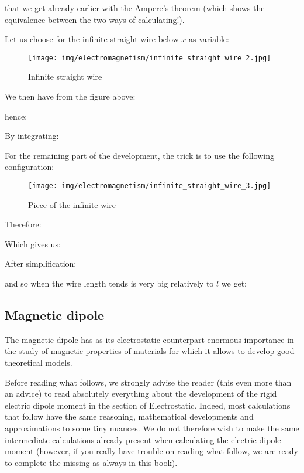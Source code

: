 	that we get already earlier with the Ampere's theorem (which shows the equivalence between the two ways of calculating!).
	
	Let us choose for the infinite straight wire below $x$ as variable:
	\begin{figure}[H]
		\centering
		\texttt{[image: img/electromagnetism/infinite\_straight\_wire\_2.jpg]}
		\caption{Infinite straight wire}
	\end{figure}
	We then have from the figure above:
	
	hence:
	
	By integrating:
	
	For the remaining part of the development, the trick is to use the following configuration:
	\begin{figure}[H]
		\centering
		\texttt{[image: img/electromagnetism/infinite\_straight\_wire\_3.jpg]}
		\caption{Piece of the infinite wire}
	\end{figure}
	Therefore:
	
	Which gives us:
	
	After simplification:
	
	and so when the wire length tends is very big relatively to $l$ we get:
	
	
	\pagebreak
	\subsection{Magnetic dipole}
	The magnetic dipole has as its electrostatic counterpart enormous importance in the study of magnetic properties of materials for which it allows to develop good theoretical models.
	
	Before reading what follows, we strongly advise the reader (this even more than an advice) to read absolutely everything about the development of the rigid electric dipole moment in the section of Electrostatic. Indeed, most calculations that follow have the same reasoning, mathematical developments and approximations to some tiny nuances. We do not therefore wish to make the same intermediate calculations already present when calculating the electric dipole moment (however, if you really have trouble on reading what follow, we are ready to complete the missing as always in this book).
	
